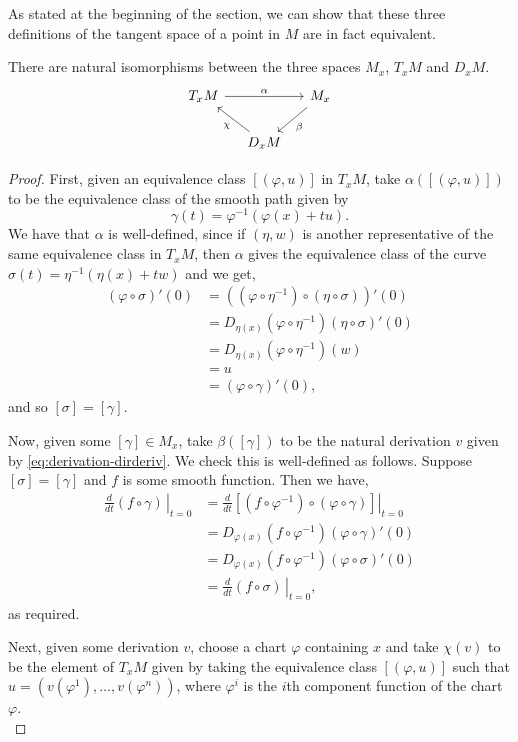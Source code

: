 \documentclass[12pt,a4paper]{article}
\begin{document}
As stated at the beginning of the section, we can show that these three definitions of the tangent space of a point in $M$ are in fact equivalent.
\begin{proposition}
There are natural isomorphisms between the three spaces $M_x$, $T_xM$ and $D_xM$.
\[
\begin{tikzcd}[column sep=small]
T_xM \arrow{rr}{\alpha} && M_x\arrow{dl}{\beta}\\
&D_xM\arrow{ul}{\chi}
\end{tikzcd}
\]
\end{proposition}
\begin{proof}
First, given an equivalence class $[(\varphi,u)]$ in $T_xM$, take $\alpha([(\varphi,u)])$ to be the equivalence class of the smooth path given by
\[
\gamma(t)=\varphi^{-1}(\varphi(x)+tu).
\]
We have that $\alpha$ is well-defined, since if $(\eta,w)$ is another representative of the same equivalence class in $T_xM$, then $\alpha$ gives the equivalence class of the curve $\sigma(t)=\eta^{-1}(\eta(x)+tw)$ and we get,
\begin{align*}
(\varphi\circ\sigma)'(0)&=\left((\varphi\circ\eta^{-1})\circ(\eta\circ\sigma) \right)'(0)\\
&=D_{\eta(x)}\left(\varphi\circ\eta^{-1} \right)(\eta\circ\sigma)'(0)\\
&=D_{\eta(x)}\left(\varphi\circ\eta^{-1}\right)(w)\\
&=u\\
&=(\varphi\circ\gamma)'(0),
\end{align*}
and so $[\sigma]=[\gamma]$.

Now, given some $[\gamma]\in M_x$, take $\beta([\gamma])$ to be the natural derivation $v$ given by \eqref{eq:derivation-dirderiv}. We check this is well-defined as follows. Suppose $[\sigma]=[\gamma]$ and $f$ is some smooth function. Then we have,
\begin{align*}
\left.\frac{d}{dt}(f\circ\gamma)\,\right\rvert_{t=0}&=\left.\frac{d}{dt}\left[(f\circ\varphi^{-1})\circ(\varphi\circ\gamma) \right]\right\rvert_{t=0}\\
&=D_{\varphi(x)}(f\circ\varphi^{-1})(\varphi\circ\gamma)'(0)\\
&=D_{\varphi(x)}(f\circ\varphi^{-1})(\varphi\circ\sigma)'(0)\\
&=\left.\frac{d}{dt}(f\circ\sigma)\,\right\rvert_{t=0},
\end{align*}
as required.

Next, given some derivation $v$, choose a chart $\varphi$ containing $x$ and take $\chi(v)$ to be the element of $T_xM$ given by taking the equivalence class $[(\varphi,u)]$ such that $u=\left(v(\varphi^1),\ldots,v(\varphi^n)\right)$, where $\varphi^i$ is the $i$th component function of the chart $\varphi$.\\


\end{proof}
\end{document}
